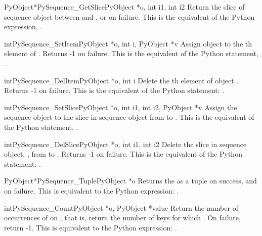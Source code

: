      \begin{cfuncdesc}{PyObject*}{PySequence_GetSlice}{PyObject *o, int i1, int i2}
	 Return the slice of sequence object  between  and , or
	 {\NULL} on failure. This is the equivalent of the Python
	 expression, .
     \end{cfuncdesc}


     \begin{cfuncdesc}{int}{PySequence_SetItem}{PyObject *o, int i, PyObject *v}
	 Assign object  to the th element of .
Returns -1 on failure.  This is the equivalent of the Python
	 statement, .
     \end{cfuncdesc}

     \begin{cfuncdesc}{int}{PySequence_DelItem}{PyObject *o, int i}
	 Delete the th element of object .  Returns
	 -1 on failure.  This is the equivalent of the Python
	 statement: .
     \end{cfuncdesc}

     \begin{cfuncdesc}{int}{PySequence_SetSlice}{PyObject *o, int i1, int i2, PyObject *v}
         Assign the sequence object  to the slice in sequence
	 object  from  to .  This is the equivalent of the Python
	 statement, .
     \end{cfuncdesc}

     \begin{cfuncdesc}{int}{PySequence_DelSlice}{PyObject *o, int i1, int i2}
	 Delete the slice in sequence object, , from  to .
	 Returns -1 on failure. This is the equivalent of the Python
	 statement: .
     \end{cfuncdesc}

     \begin{cfuncdesc}{PyObject*}{PySequence_Tuple}{PyObject *o}
	 Returns the  as a tuple on success, and {\NULL} on failure.
	 This is equivalent to the Python expression: .
     \end{cfuncdesc}

     \begin{cfuncdesc}{int}{PySequence_Count}{PyObject *o, PyObject *value}
         Return the number of occurrences of  on , that is,
	 return the number of keys for which .  On
	 failure, return -1.  This is equivalent to the Python
	 expression: .
     \end{cfuncdesc}

